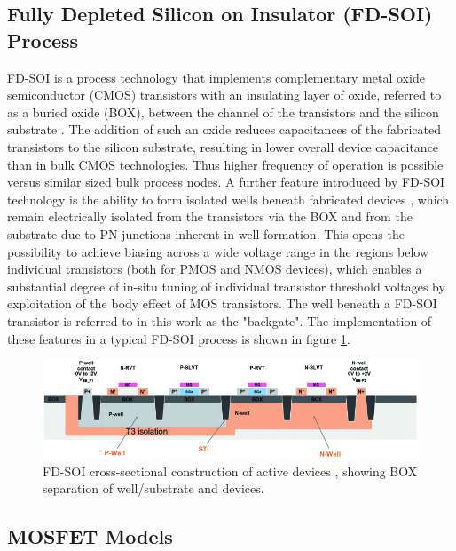 	\subsection{Fully Depleted Silicon on Insulator (FD-SOI) Process}
	FD-SOI is a process technology that implements complementary metal oxide semiconductor (CMOS) transistors with an insulating layer of oxide, referred to as a buried oxide (BOX), between the channel of the transistors and the silicon substrate \cite{Planes2012}. The addition of such an oxide reduces capacitances of the fabricated transistors to the silicon substrate, resulting in lower overall device capacitance than in bulk CMOS technologies. Thus higher frequency of operation is possible versus similar sized bulk process nodes. A further feature introduced by FD-SOI technology is the ability to form isolated wells beneath fabricated devices \cite{Wiatr2019}, which remain electrically isolated from the transistors via the BOX and from the substrate due to PN junctions inherent in well formation. This opens the possibility to achieve biasing across a wide voltage range in the regions below individual transistors (both for PMOS and NMOS devices), which enables a substantial degree of in-situ tuning of individual transistor threshold voltages by exploitation of the body effect of MOS transistors. The well beneath a FD-SOI transistor is referred to in this work as the "backgate". The implementation of these features in a typical FD-SOI process is shown in figure \ref{fig:22fdx_wells}. 
	
			\begin{figure}[htb!]
			        \centering
			        \includegraphics[width=1\textwidth, angle=0]{./figs/theory/wiatr1-p4-wiatr-large}
			    \caption{FD-SOI cross-sectional construction of active devices \cite{Wiatr2019}, showing BOX separation of well/substrate and devices.}
			    \label{fig:22fdx_wells}
			\end{figure}
	
	\subsection{MOSFET Models}


